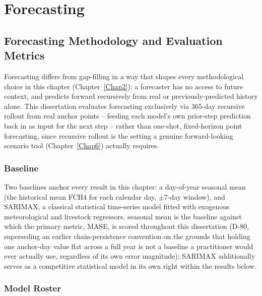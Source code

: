 \chapter{Forecasting} \label{Chap5}

\section{Forecasting Methodology and Evaluation Metrics}

Forecasting differs from gap-filling in a way that shapes every methodological choice in this
chapter (Chapter~\ref{Chap2}): a forecaster has no access to future context, and predicts forward
recursively from real or previously-predicted history alone. This dissertation evaluates
forecasting exclusively via 365-day recursive rollout from real anchor points -- feeding each
model's own prior-step prediction back in as input for the next step -- rather than one-shot,
fixed-horizon point forecasting, since recursive rollout is the setting a genuine forward-looking
scenario tool (Chapter~\ref{Chap6}) actually requires.

\subsection{Baseline}

Two baselines anchor every result in this chapter: a day-of-year seasonal mean (the historical mean
FCH4 for each calendar day, $\pm$7-day window), and SARIMAX, a classical statistical
time-series model fitted with exogenous meteorological and livestock regressors. seasonal mean is the
baseline against which the primary metric, MASE, is scored throughout this dissertation (D-80,
superseding an earlier chain-persistence convention on the grounds that holding one anchor-day
value flat across a full year is not a baseline a practitioner would ever actually use, regardless
of its own error magnitude); SARIMAX additionally serves as a competitive statistical model in its
own right within the results below.

\subsection{Model Roster}

